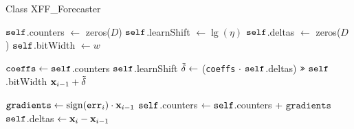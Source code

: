 
\newenvironment{megaalgorithm}[1][htb]
  {\renewcommand{\algorithmcfname}{MegaAlgorithm}%
   \begin{algorithm}[#1]%
  }{\end{algorithm}}


\begin{algorithm}[h]
\caption{Class XFF\_Forecaster}
\begin{algorithmic}[1]


\State $\texttt{self}$.counters $\leftarrow $ zeros($D$)
\State $\texttt{self}$.learnShift $\leftarrow \lg(\eta)$
\State $\texttt{self}$.deltas $\leftarrow $ zeros($D$)
\State $\texttt{self}$.bitWidth $\leftarrow w$ 
\EndFunction

\State $\texttt{coeffs} \leftarrow \texttt{self}$.counters \rshift $\texttt{self}$.learnShift
\State $\tilde{\mathbf{\delta}} \leftarrow$ (\texttt{coeffs} $\cdot$ $\texttt{self}$.deltas) $\texttt{>>}\text{ } \texttt{self}$.bitWidth
\RETURN $\mathbf{x}_{i-1} + \tilde{\mathbf{\delta}}$
\EndFunction

\State $\texttt{gradients} \leftarrow \operatorname{sign}(\texttt{err}_i) \cdot \mathbf{x}_{i-1}$
\State $\texttt{self}$.counters $\leftarrow \texttt{self}$.counters + $\texttt{gradients}$
\State $\texttt{self}$.deltas $\leftarrow \mathbf{x}_{i} - \mathbf{x}_{i-1}$
\EndFunction


\end{algorithmic}
\end{algorithm}


